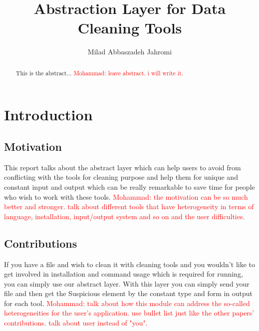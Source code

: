 \documentclass[12pt]{article}
\title{Abstraction Layer for Data Cleaning Tools}
\author{Milad Abbaszadeh Jahromi\inst{1}}
\newcommand{\mohammad}[1]{\textcolor{red}{Mohammad: #1}}
\begin{document}
 
\maketitle


\begin{abstract} 
	This is the abstract...
	\mohammad{leave abstract. i will write it.}
		
\end{abstract}


\section{Introduction}
\label{section:introduction}

\subsection{Motivation}
This report talks about the abstract layer which can help users to avoid from conflicting with the tools for cleaning purpose and help them for unique and constant input and output which can be really remarkable to save time for people who wish to work with these tools.
\mohammad{the motivation can be so much better and stronger. talk about different tools that have heterogeneity in terms of language, installation, input/output system and so on and the user difficulties.}

\subsection{Contributions}
If you have a file and wish to clean it with cleaning tools and you wouldn’t like to get involved in installation and command usage which is required for running, you can simply use our abstract layer.
With this layer you can simply send your file and then get the Suspicious element by the constant type and form in output for each tool.
\mohammad{talk about how this module can address the so-called heterogeneities for the user's application. use bullet list just like the other papers' contributions. talk about user instead of "you".}
\end{document}
